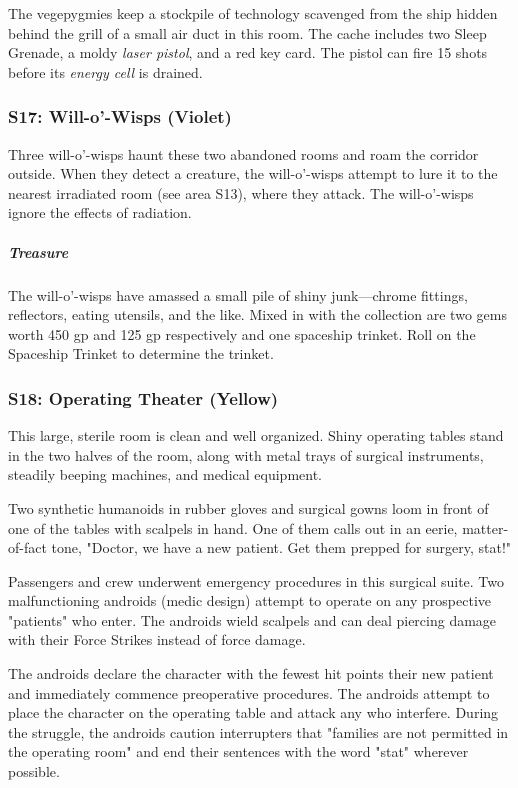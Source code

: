\documentclass[10pt,a4paper,twoside,bg=print,twocolumn,openany,nodeprecatedcode]{dndbook}
\begin{document}
The vegepygmies keep a stockpile of technology scavenged from the ship hidden behind the grill of a small air duct in this room. The cache includes two Sleep Grenade, a moldy \textit{laser pistol}, and a red key card. The pistol can fire 15 shots before its \textit{energy cell} is drained.

\subsubsection{S17: Will-o'-Wisps (Violet)}
Three will-o'-wisps haunt these two abandoned rooms and roam the corridor outside. When they detect a creature, the will-o'-wisps attempt to lure it to the nearest irradiated room (see area S13), where they attack. The will-o'-wisps ignore the effects of radiation.

\subparagraph{Treasure}
The will-o'-wisps have amassed a small pile of shiny junk—chrome fittings, reflectors, eating utensils, and the like. Mixed in with the collection are two gems worth 450 gp and 125 gp respectively and one spaceship trinket. Roll on the Spaceship Trinket to determine the trinket.

\subsubsection{S18: Operating Theater (Yellow)}
\begin{DndReadAloud}{}
This large, sterile room is clean and well organized. Shiny operating tables stand in the two halves of the room, along with metal trays of surgical instruments, steadily beeping machines, and medical equipment.

Two synthetic humanoids in rubber gloves and surgical gowns loom in front of one of the tables with scalpels in hand. One of them calls out in an eerie, matter-of-fact tone, "Doctor, we have a new patient. Get them prepped for surgery, stat!"

\end{DndReadAloud}

Passengers and crew underwent emergency procedures in this surgical suite. Two malfunctioning androids (medic design) attempt to operate on any prospective "patients" who enter. The androids wield scalpels and can deal piercing damage with their Force Strikes instead of force damage.

The androids declare the character with the fewest hit points their new patient and immediately commence preoperative procedures. The androids attempt to place the character on the operating table and attack any who interfere. During the struggle, the androids caution interrupters that "families are not permitted in the operating room" and end their sentences with the word "stat" wherever possible.
\end{document}
